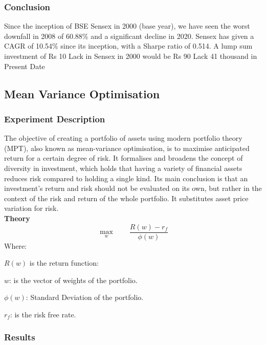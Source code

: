 \subsubsection{Conclusion}
Since the inception of BSE Sensex in 2000 (base year), we have seen the worst downfall in 2008 of 60.88\% and a significant decline in 2020. Sensex has given a CAGR of 10.54\% since its inception, with a Sharpe ratio of 0.514. A lump sum investment of Rs 10 Lack in Sensex in 2000 would be Rs 90 Lack 41 thousand in Present Date 
\subsection{Mean Variance Optimisation}
\subsubsection{Experiment Description}
The objective of creating a portfolio of assets using modern portfolio theory (MPT), also known as mean-variance optimisation, is to maximise anticipated return for a certain degree of risk. It formalises and broadens the concept of diversity in investment, which holds that having a variety of financial assets reduces risk compared to holding a single kind. Its main conclusion is that an investment's return and risk should not be evaluated on its own, but rather in the context of the risk and return of the whole portfolio. It substitutes asset price variation for risk.\\
\textbf{Theory}
\[\underset{w}{\max}\qquad \frac{R (w) - r_{f}}{\phi(w)}\]
Where:

$R(w)$ is the return function:

$w$: is the vector of weights of the portfolio.

$\phi(w)$: Standard Deviation of the portfolio.

$r_{f}$: is the risk free rate.\\
\subsubsection{Results}

